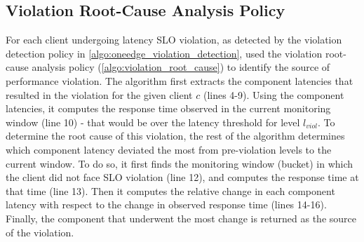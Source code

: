 \subsection{Violation Root-Cause Analysis Policy}
For each client undergoing latency SLO violation, as detected by the violation detection policy in \cref{algo:oneedge_violation_detection}, \oneedge{} used the violation root-cause analysis policy (\cref{algo:violation_root_cause}) to identify the source of performance violation. The algorithm first extracts the component latencies that resulted in the violation for the given client $c$ (lines 4-9). Using the component latencies, it computes the response time observed in the current monitoring window (line 10) - that would be over the latency threshold for level $l_{viol}$. To determine the root cause of this violation, the rest of the algorithm determines which component latency deviated the most from pre-violation levels to the current window. To do so, it first finds the monitoring window (bucket) in which the client did not face SLO violation (line 12), and computes the response time at that time (line 13). Then it computes the relative change in each component latency with respect to the change in observed response time (lines 14-16). Finally, the component that underwent the most change is returned as the source of the violation.
